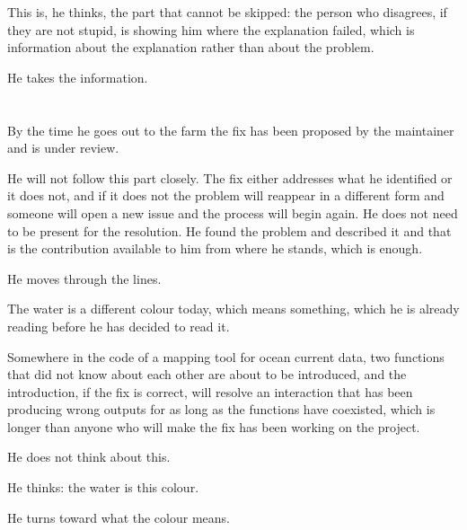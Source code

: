This is, he thinks, the part that cannot be
skipped: the person who disagrees, if they are
not stupid, is showing him where the explanation
failed, which is information about the explanation
rather than about the problem.

He takes the information.

\section{}

By the time he goes out to the farm the fix has
been proposed by the maintainer and is under review.

He will not follow this part closely. The fix
either addresses what he identified or it does
not, and if it does not the problem will reappear
in a different form and someone will open a new
issue and the process will begin again. He does
not need to be present for the resolution. He
found the problem and described it and that is
the contribution available to him from where he
stands, which is enough.

He moves through the lines.

The water is a different colour today, which means
something, which he is already reading before he
has decided to read it.

Somewhere in the code of a mapping tool for ocean
current data, two functions that did not know about
each other are about to be introduced, and the
introduction, if the fix is correct, will resolve
an interaction that has been producing wrong outputs
for as long as the functions have coexisted, which
is longer than anyone who will make the fix has
been working on the project.

He does not think about this.

He thinks: the water is this colour.

He turns toward what the colour means.

